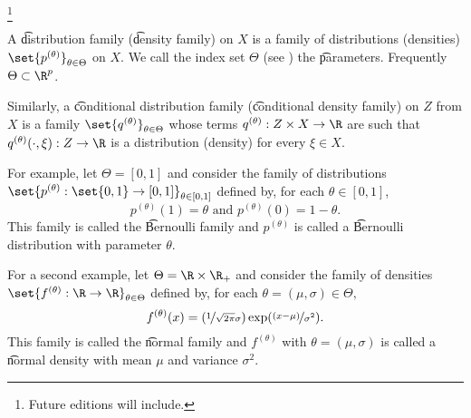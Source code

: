 
\footnote{Future editions will include.}


A \t{distribution family} (\t{density family}) on $X$  is a family of distributions (densities) $\set{p^{(\theta)}}_{\theta \in \Theta}$ on $X$.
We call the index set $\Theta$ (see ) the \t{parameters}.
Frequently $\Theta \subset \R^p$.

Similarly, a \t{conditional distribution family} (\t{conditional density family}) on $Z$ from $X$ is a family $\set{q^{(\theta)}}_{\theta \in \Theta}$ whose terms $q^{(\theta)}: Z \times X \to \R$ are such that $q^{(\theta)}(\cdot, \xi): Z \to \R$ is a distribution (density) for every $\xi \in X$.


For example, let $\Theta = [0, 1]$ and consider the family of distributions $\set{p^{(\theta)}: \set{0, 1} \to [0,1]}_{\theta \in [0,1]}$ defined by, for each $\theta \in [0,1]$,
\[
  p^{(\theta)}(1) = \theta \text{ and } p^{(\theta)}(0) = 1-\theta.
\]
This family is called the \t{Bernoulli family} and $p^{(\theta)}$ is called a \t{Bernoulli distribution} with parameter $\theta$.

For a second example, let $\Theta = \R \times \R_{+}$ and consider the family of densities $\set{f^{(\theta)}: \R \to \R}_{\theta \in \Theta}$ defined by, for each $\theta = (\mu, \sigma) \in \Theta,$
\[
  f^{(\theta)}(x) = (\nicefrac{1}{\sqrt{2\pi}\sigma})\exp(\nicefrac{(x - \mu)}{\sigma^2}).
\]
This family is called the \t{normal family} and $f^{(\theta)}$ with $\theta = (\mu, \sigma)$ is called a \t{normal density} with mean $\mu$ and variance $\sigma^2$.


